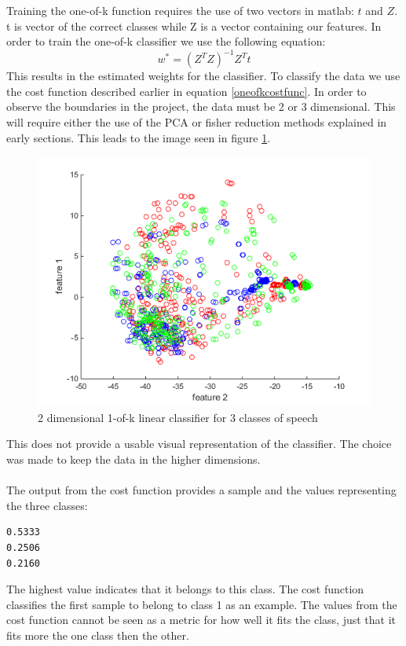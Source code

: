 Training the one-of-k function requires the use of two vectors in matlab: $t$ and $Z$. t is vector of the correct classes while Z is a vector containing our features. In order to train the one-of-k classifier we use the following equation:
\begin{equation}
w^* = (Z^T Z)^{-1} Z^T t
\end{equation}
This results in the estimated weights for the classifier. To classify the data we use the cost function described earlier in equation \ref{oneofkcostfunc}.
In order to observe the boundaries in the project, the data must be 2 or 3 dimensional. This will require either the use of the PCA or fisher reduction methods explained in early sections. This leads to the image seen in figure \ref{2dimoneofk}.
\begin{figure}[H]
\centering
\includegraphics[scale=0.5]{billeder/2dimoneofk}
\caption{2 dimensional 1-of-k linear classifier for 3 classes of speech}
\label{2dimoneofk}
\end{figure}
This does not provide a usable visual representation of the classifier. The choice was made to keep the data in the higher dimensions.\\\ \\
The output from the cost function provides a sample and the values representing the three classes:
\begin{verbatim}
0.5333
0.2506
0.2160
\end{verbatim}
The highest value indicates that it belongs to this class. The cost function classifies the first sample to belong to class 1 as an example. The values from the cost function cannot be seen as a metric for how well it fits the class, just that it fits more the one class then the other. \\\ \\

